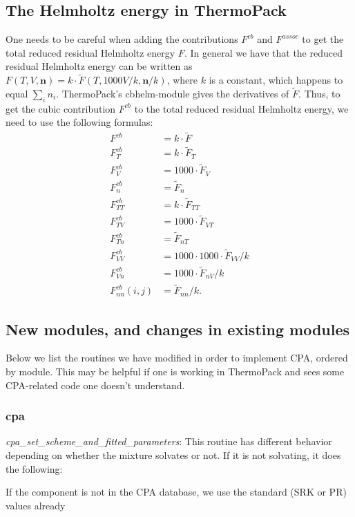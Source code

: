 \documentclass[10pt, a4paper]{article}
\newcommand{\mbf}[0]{\mathbf}
\begin{document}
\subsection{The Helmholtz energy in ThermoPack}
One needs to be careful when adding the contributions $F^{cb}$ and $F^{assoc}$ to get the total reduced residual Helmholtz energy $F$. In general we have that the reduced residual Helmholtz energy can be written as $F(T,V,\mbf n) = k \cdot \tilde F(T,1000 V/k,\mbf n/k)$, where $k$ is a constant, which happens to equal $\sum_i n_i$. ThermoPack's cbhelm-module gives the derivatives of $\tilde F$. Thus, to get the cubic contribution $F^{cb}$ to the total reduced residual Helmholtz energy, we need to use the following formulas:
\begin{align}
    F^{cb} &=  k\cdot\tilde{F} \\
    F^{cb}_T &=  k\cdot\tilde{F}_T \\
    F^{cb}_V &=  1000\cdot\tilde{F}_V \\
    F^{cb}_n &=  \tilde{F}_n \\
    F^{cb}_{TT} &= k \cdot \tilde{F}_{TT} \\
    F^{cb}_{TV} &= 1000\cdot\tilde{F}_{VT} \\
    F^{cb}_{Tn} &= \tilde{F}_{nT} \\
    F^{cb}_{VV} &= 1000\cdot1000\cdot\tilde{F}_{VV}/k \\
    F^{cb}_{Vn} &= 1000\cdot\tilde{F}_{nV}/k \\
    F^{cb}_{nn}(i,j) &= \tilde{F}_{nn}/k.
\end{align}

\subsection{New modules, and changes in existing modules}
Below we list the routines we have modified in order to implement CPA, ordered by module. This may be helpful if one is working in ThermoPack and sees some CPA-related code one doesn't understand.

\subsubsection*{cpa}
\textit{cpa\_set\_scheme\_and\_fitted\_parameters}: This routine has different behavior depending on whether the mixture solvates or not. If it is not solvating, it does the following:

If the component is not in the CPA database, we use the standard (SRK or PR) values already
\end{document}
